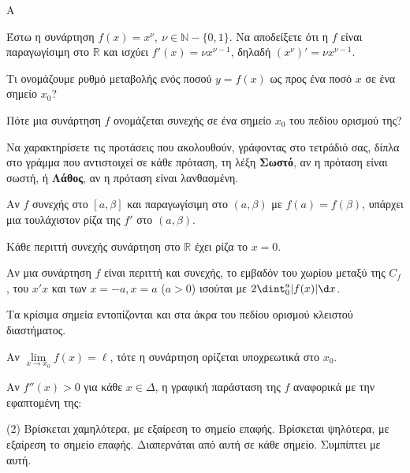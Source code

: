 \begin{thema}{A}
\begin{erwthma}
    \item Έστω η συνάρτηση $ f(x)=x^{\nu},\ \nu\in\mathbb{N}-\{0,1\} $. Να αποδείξετε ότι η $ f $ είναι παραγωγίσιμη στο $ \mathbb{R} $ και ισχύει $ f'(x)=\nu x^{\nu-1} $, δηλαδή $ \left(x^\nu\right)'=\nu x^{\nu-1} $.
    \item Τι ονομάζουμε ρυθμό μεταβολής ενός ποσού $y=f(x)$ ως προς ένα ποσό $x$ σε ένα σημείο $x_0$?
    \item Πότε μια συνάρτηση $f$ ονομάζεται συνεχής σε ένα σημείο $x_0$ του πεδίου ορισμού της?
    \item Να χαρακτηρίσετε τις προτάσεις που ακολουθούν, γράφοντας στο τετράδιό σας, δίπλα στο γράμμα που αντιστοιχεί σε κάθε πρόταση, τη λέξη \textbf{Σωστό}, αν η πρόταση είναι σωστή, ή \textbf{Λάθος}, αν η πρόταση είναι λανθασμένη.
    \begin{alist}
        \item Αν $f$ συνεχής στο $[a, \beta]$ και παραγωγίσιμη στο $(a, \beta)$ με $f(a)=f(\beta)$, υπάρχει μια τουλάχιστον ρίζα της $f'$ στο $(a, \beta)$.
        \item Κάθε περιττή συνεχής συνάρτηση στο $\mathbb{R}$ έχει ρίζα το $x=0$.
        \item Αν μια συνάρτηση $f$ είναι περιττή και συνεχής, το εμβαδόν του χωρίου μεταξύ της $C_f$, του $x'x$ και των $x=-a, x=a$ ($a>0$) ισούται με $2\dint_0^a |f(x)| \d x$.
        \item Τα κρίσιμα σημεία εντοπίζονται και στα άκρα του πεδίου ορισμού κλειστού διαστήματος.
        \item Αν $\lim\limits_{x\to x_0} f(x) = \ell$, τότε η συνάρτηση ορίζεται υποχρεωτικά στο $x_0$.
    \end{alist}
    \item Αν $f''(x) > 0$ για κάθε $x \in \Delta$, η γραφική παράσταση της $f$ αναφορικά με την εφαπτομένη της:
    \begin{tasks}[label=\let\textdexiakeraia\relax\alph*.](2)
        \task Βρίσκεται χαμηλότερα, με εξαίρεση το σημείο επαφής.
        \task Βρίσκεται ψηλότερα, με εξαίρεση το σημείο επαφής.
        \task Διαπερνάται από αυτή σε κάθε σημείο.
        \task Συμπίπτει με αυτή.
    \end{tasks}
\end{erwthma}
\end{thema}



